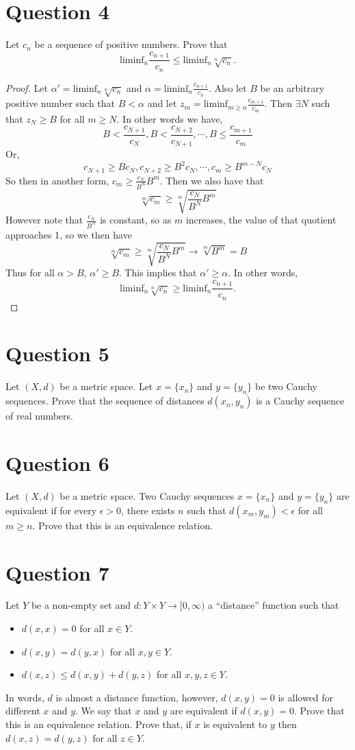 \documentclass[12pt, letterpaper]{article}
\begin{document}
\section*{Question 4}
Let $c_n$ be a sequence of positive numbers. Prove that
\[
\mathrm{liminf}_n \frac{c_{n+1}}{c_n} \leq \mathrm{liminf}_n \sqrt[n]{c_n}.
\]
\begin{proof}
  Let $\alpha'= \mathrm{liminf}_n \sqrt[n]{c_n}$ and $\alpha = \mathrm{liminf}_n \frac{c_{n+1}}{c_n}$. Also let $B$ be an arbitrary positive number such that $B < \alpha$ and let $z_m = \mathrm{liminf}_{m \geq n} \frac{c_{m+1}}{c_m}$. Then $\exists N$ such that $z_N \geq B$ for all $m \geq N$. In other words we have,
  $$ B < \frac{c_{N + 1}}{c_N}, B < \frac{c_{N + 2}}{c_{N + 1}}, \cdots, B \leq \frac{c_{m + 1}}{c_m}$$
  Or,
  $$ c_{N+1} \geq Bc_N, c_{N+2} \geq B^2c_N, \cdots, c_m \geq B^{m - N}c_N $$
  So then in another form, $c_m \geq \frac{c_N}{B^N}B^m$. Then we also have that
  $$ \sqrt[m]{c_m} \geq \sqrt[m]{\frac{c_N}{B^N}B^m} $$
  However note that $\frac{c_N}{B^N}$ is constant, so as $m$ increases, the value of that quotient approaches 1, so we then have
  $$ \sqrt[m]{c_m} \geq \sqrt[m]{\frac{c_N}{B^N}B^m} \to \sqrt[m]{B^m} = B$$
  Thus for all $\alpha > B$, $\alpha' \geq B$. This implies that $\alpha' \geq \alpha$. In other words,
  \[
  \mathrm{liminf}_n \sqrt[n]{c_n} \geq \mathrm{liminf}_n \frac{c_{n+1}}{c_n}.
  \]
\end{proof}
\pagebreak

\section*{Question 5}
Let $(X,d)$ be a metric space.  Let $x=\{x_n\}$ and $y=\{y_n\}$ be two Cauchy sequences.
Prove that the sequence of distances $d(x_n,y_n)$ is a Cauchy sequence of real numbers.


\section*{Question 6}
Let $(X,d)$ be a metric space.  Two Cauchy sequences $x=\{x_n\}$ and $y=\{y_n\}$ are equivalent if for every $\epsilon >0$, there exists $n$ such that
$d(x_m,y_m ) < \epsilon$ for all $m\geq n$. Prove that this is an equivalence relation.

\section*{Question 7}
Let $Y$ be a non-empty set and $d: Y \times Y\rightarrow [0, \infty)$ a ``distance'' function such that
\begin{itemize}
\item $d(x,x)=0$  for all $x\in Y$.
\item $d(x,y)=d(y,x)$  for all $x,y\in Y$.
\item $d(x,z) \leq d(x,y) + d(y,z)$ for all $x,y,z\in Y$.
\end{itemize}
In words, $d$ is almost a distance function, however, $d(x,y)=0$ is allowed for different $x$ and $y$. We say that $x$ and $y$ are
equivalent if $d(x,y)=0$. Prove that this is an equivalence relation. Prove that, if $x$ is equivalent to $y$ then $d(x,z)=d(y,z)$ for all $z\in Y$. 
\end{document}

